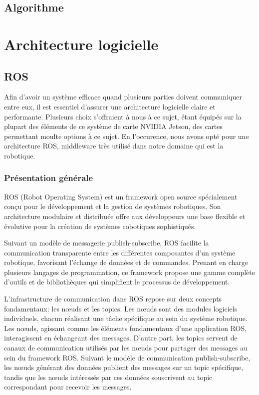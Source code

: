 \documentclass[12pt]{report}
\begin{document}
\section{Algorithme}

\chapter{Architecture logicielle}
\section{ROS}
Afin d'avoir un système efficace quand plusieurs parties doivent communiquer entre eux, il est essentiel
d'assurer une architecture logicielle claire et performante. Plusieurs choix s'offraient à nous à ce sujet,
étant équipés sur la plupart des éléments de ce système de carte NVIDIA Jetson, des cartes permettant moulte
options à ce sujet. En l'occurence, nous avons opté pour une architecture ROS, middleware très utilisé
dans notre domaine qui est la robotique.

\subsection{Présentation générale}
ROS (Robot Operating System) est un framework open source spécialement conçu pour le développement 
et la gestion de systèmes robotiques. Son architecture modulaire et distribuée offre aux développeurs
une base flexible et évolutive pour la création de systèmes robotiques sophistiqués.

Suivant un modèle de messagerie publish-subscribe, ROS facilite la communication transparente
entre les différentes composantes d'un système robotique, favorisant l'échange de données et de
commandes. Prenant en charge plusieurs langages de programmation, ce framework propose une
gamme complète d'outils et de bibliothèques qui simplifient le processus de développement.

L'infrastructure de communication dans ROS repose sur deux concepts fondamentaux: les nœuds
et les topics. Les nœuds sont des modules logiciels individuels, chacun réalisant une tâche spécifique
au sein du système robotique. Les nœuds, agissant comme les éléments fondamentaux d'une application ROS,
interagissent en échangeant des messages. D'autre part, les topics servent de canaux de communication
utilisés par les nœuds pour partager des messages au sein du framework ROS. Suivant
le modèle de communication publish-subscribe, les nœuds générant des données publient des messages sur
un topic spécifique, tandis que les nœuds intéressés par ces données souscrivent au topic correspondant
pour recevoir les messages.
\end{document}

